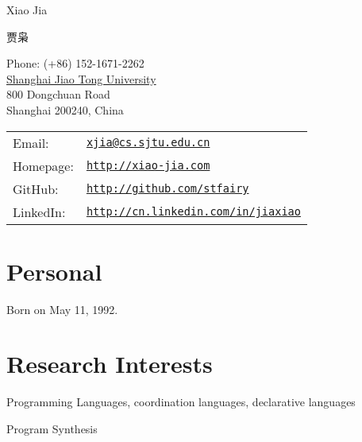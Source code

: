 \documentclass[letterpaper]{article}
\def\name{Xiao Jia}
\def\cname{贾枭}
\renewenvironment{itemize}{
  \begin{list}{}{
    \setlength{\leftmargin}{1.5em}
    \vspace{-3mm}
  }
}{
  \end{list}
}
\begin{document}
{\huge \name ~ \begin{CJK}{UTF8}{gkai}\cname\end{CJK}}


\vspace{0.25in}

\begin{minipage}{0.45\linewidth}
  Phone: (+86) 152-1671-2262 \\
  \href{http://www.sjtu.edu.cn/}{Shanghai Jiao Tong University} \\
  800 Dongchuan Road \\
  Shanghai 200240, China 
\end{minipage}
\begin{minipage}{0.45\linewidth}
  \begin{tabular}{ll}
    Email: & \href{mailto:xjia@cs.sjtu.edu.cn}{\tt xjia@cs.sjtu.edu.cn} \\
    Homepage: & \href{http://xiao-jia.com/}{\tt http://xiao-jia.com} \\
      GitHub: & \href{https://github.com/stfairy}{\tt http://github.com/stfairy} \\
    LinkedIn: & \href{http://cn.linkedin.com/in/jiaxiao}{\tt http://cn.linkedin.com/in/jiaxiao}
  \end{tabular}
\end{minipage}


\section*{Personal}

\begin{itemize}
  \item Born on May 11, 1992.
\end{itemize}


\vspace{-7mm}
\section*{Research Interests}

\begin{itemize}
  \item Programming Languages, coordination languages, declarative languages
  \item Program Synthesis
\end{itemize}
\end{document}
